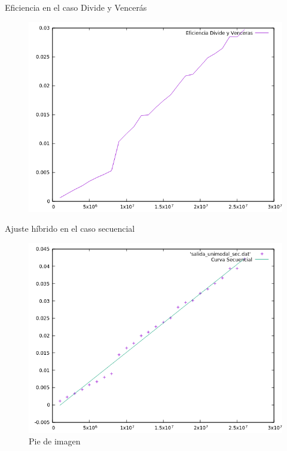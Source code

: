 \documentclass[12pt]{beamer}
\begin{document}
\begin{frame}{Eficiencia en el caso Divide y Vencerás}

\begin{figure}[H] 
\centering
\includegraphics[angle=0,scale=0.5]{img/Eficiencia_dyv.png} 
\label{etiqueta} 
\end{figure}

\end{frame}

\begin{frame}{Ajuste híbrido en el caso secuencial}

\begin{figure}[H] 
\centering
\includegraphics[angle=0,scale=0.5]{img/AjusteHibridoSec.png} 
\caption{Pie de imagen} 
\end{figure}

\end{frame}
\end{document}
